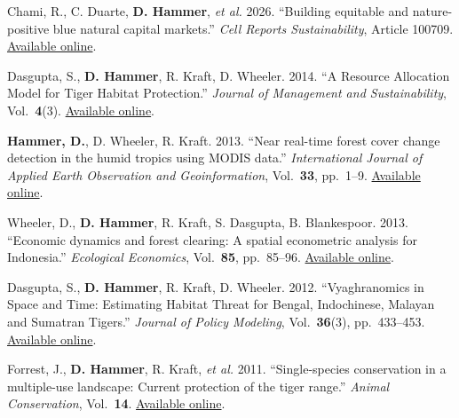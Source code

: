 \documentclass[10pt,letterpaper]{article}
\renewenvironment{itemize}{
  \begin{list}{}{
    \setlength{\leftmargin}{1.5em}
    \setlength{\itemsep}{0.25em}
    \setlength{\parskip}{0pt}
    \setlength{\parsep}{0.25em}
  }
}{
  \end{list}
}
\begin{document}
\begin{itemize}
  \item Chami, R., C. Duarte, \textbf{D. Hammer}, \emph{et al.} 2026. ``Building equitable and nature-positive blue natural capital markets.'' \emph{Cell Reports Sustainability}, Article 100709. \href{https://www.sciencedirect.com/science/article/pii/S2949790626000789}{Available online}.
  \item Dasgupta, S., \textbf{D. Hammer}, R. Kraft, D. Wheeler. 2014. ``A Resource Allocation Model for Tiger Habitat Protection.'' \emph{Journal of Management and Sustainability}, Vol.~\textbf{4}(3). \href{http://www.ccsenet.org/journal/index.php/jms/article/view/36252/22130}{Available online}.
  \item \textbf{Hammer, D.}, D. Wheeler, R. Kraft. 2013. ``Near real-time forest cover change detection in the humid tropics using MODIS data.'' \emph{International Journal of Applied Earth Observation and Geoinformation}, Vol.~\textbf{33}, pp.~1--9. \href{https://s3.amazonaws.com/gfw-files/Hammer+et+al+2014.pdf}{Available online}.
  \item Wheeler, D., \textbf{D. Hammer}, R. Kraft, S. Dasgupta, B. Blankespoor. 2013. ``Economic dynamics and forest clearing: A spatial econometric analysis for Indonesia.'' \emph{Ecological Economics}, Vol.~\textbf{85}, pp.~85--96. \href{http://www.sciencedirect.com/science/article/pii/S0921800912004272}{Available online}.
  \item Dasgupta, S., \textbf{D. Hammer}, R. Kraft, D. Wheeler. 2012. ``Vyaghranomics in Space and Time: Estimating Habitat Threat for Bengal, Indochinese, Malayan and Sumatran Tigers.'' \emph{Journal of Policy Modeling}, Vol.~\textbf{36}(3), pp.~433--453. \href{http://www.sciencedirect.com/science/article/pii/S0161893814000386}{Available online}.
  \item Forrest, J., \textbf{D. Hammer}, R. Kraft, \emph{et al.} 2011. ``Single-species conservation in a multiple-use landscape: Current protection of the tiger range.'' \emph{Animal Conservation}, Vol.~\textbf{14}. \href{http://onlinelibrary.wiley.com/doi/10.1111/j.1469-1795.2010.00428.x/abstract}{Available online}.
\end{itemize}

\end{document}

